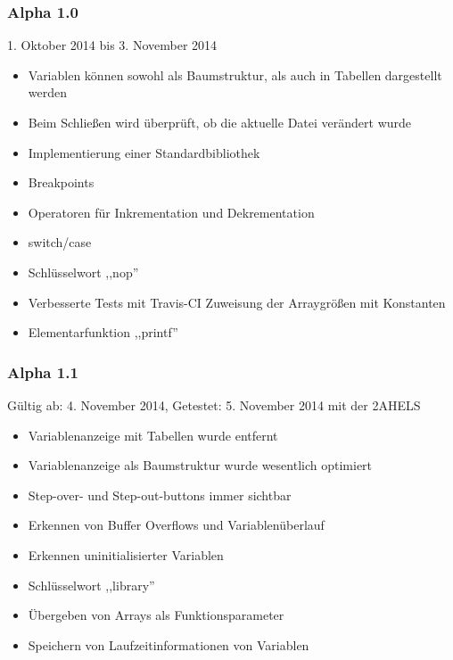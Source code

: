 \subsubsection*{Alpha 1.0}
1. Oktober 2014 bis 3. November 2014
\begin{itemize}
\item Variablen können sowohl als Baumstruktur, als auch in Tabellen dargestellt werden
\item Beim Schließen wird überprüft, ob die aktuelle Datei verändert wurde
\item Implementierung einer Standardbibliothek
\item Breakpoints
\item Operatoren für Inkrementation und Dekrementation
\item switch/case
\item Schlüsselwort ,,nop''
\item Verbesserte Tests mit Travis-CI
Zuweisung der Arraygrößen mit Konstanten
\item Elementarfunktion ,,printf''
\end{itemize}

\subsubsection*{Alpha 1.1}
Gültig ab: 4. November 2014,\newline
Getestet: 5. November 2014 mit der 2AHELS
\begin{itemize}
\item Variablenanzeige mit Tabellen wurde entfernt
\item Variablenanzeige als Baumstruktur wurde wesentlich optimiert
\item Step-over- und Step-out-buttons immer sichtbar
\item Erkennen von Buffer Overflows und Variablenüberlauf
\item Erkennen uninitialisierter Variablen
\item Schlüsselwort ,,library''
\item Übergeben von Arrays als Funktionsparameter
\item Speichern von Laufzeitinformationen von Variablen
\end{itemize}

